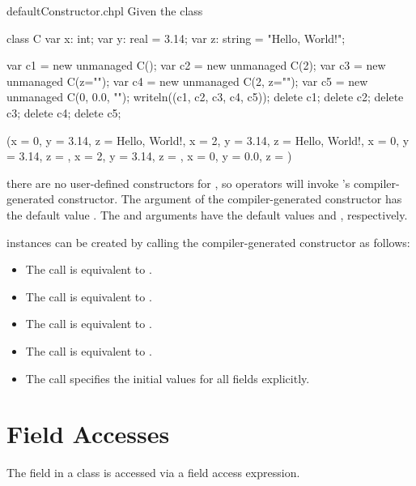 \begin{chapelexample}{defaultConstructor.chpl}
Given the class
\begin{chapel}
class C {
  var x: int;
  var y: real = 3.14;
  var z: string = "Hello, World!";
}
\end{chapel}
\begin{chapelpost}
var c1 = new unmanaged C();
var c2 = new unmanaged C(2);
var c3 = new unmanaged C(z="");
var c4 = new unmanaged C(2, z="");
var c5 = new unmanaged C(0, 0.0, "");
writeln((c1, c2, c3, c4, c5));
delete c1;
delete c2;
delete c3;
delete c4;
delete c5;
\end{chapelpost}
\begin{chapeloutput}
({x = 0, y = 3.14, z = Hello, World!}, {x = 2, y = 3.14, z = Hello, World!}, {x = 0, y = 3.14, z = }, {x = 2, y = 3.14, z = }, {x = 0, y = 0.0, z = })
\end{chapeloutput}
there are no user-defined constructors for , so  operators
will invoke 's compiler-generated constructor. The  argument
of the compiler-generated constructor has the default value .
The  and  arguments have the default values  and
, respectively.

 instances can be created by calling the compiler-generated constructor as follows:
\begin{itemize}
\item The call  is equivalent to .
\item The call  is equivalent to .
\item The call  is equivalent to .
\item The call  is equivalent to .
\item The call  specifies the initial values for all fields explicitly.
\end{itemize}
\end{chapelexample}

\section{Field Accesses}
\label{Class_Field_Accesses}

The field in a class is accessed via a field access expression.

